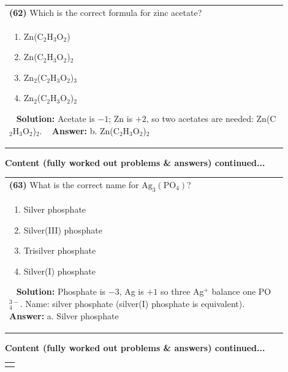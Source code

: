 \documentclass{article}
\begin{document}
{\begin{tabular}{|p{0.9\linewidth}|}
\hline
\vspace{0.2cm}
\textbf{(62)} Which is the correct formula for zinc acetate? \\
\begin{minipage}[t]{0.85\linewidth}
\begin{enumerate}[label=\alph*.]
\item Zn(C$_2$H$_3$O$_2$) \
\item Zn(C$_2$H$_3$O$_2$)$_2$ \
\item Zn$_2$(C$_2$H$_3$O$_2$)$_3$ \
\item Zn$_2$(C$_2$H$_3$O$_2$)$_2$
\end{enumerate}
\end{minipage}\
\hline
\vspace{0.2cm}
\textbf{Solution:} Acetate is $-1$; Zn is $+2$, so two acetates are needed: Zn(C$_2$H$_3$O$_2$)$_2$. \
\hline
\vspace{0.2cm}
\textbf{Answer:} b. Zn(C$_2$H$_3$O$_2$)$_2$ \
\hline
\end{tabular}
\newpage
\noindent
{\large\textbf{Content (fully worked out problems & answers) continued...}}\\[0.2em]
\begin{tabular}{|p{0.9\linewidth}|}
\hline
\vspace{0.2cm}
\textbf{(63)} What is the correct name for $\text{Ag}_3(\text{PO}_4)$? \\
\begin{minipage}[t]{0.85\linewidth}
\begin{enumerate}[label=\alph*.]
\item Silver phosphate \
\item Silver(III) phosphate \
\item Trisilver phosphate \
\item Silver(I) phosphate
\end{enumerate}
\end{minipage}\
\hline
\vspace{0.2cm}
\textbf{Solution:} Phosphate is $-3$, Ag is $+1$ so three Ag$^+$ balance one PO$_4^{3-}$. Name: silver phosphate (silver(I) phosphate is equivalent). \
\hline
\vspace{0.2cm}
\textbf{Answer:} a. Silver phosphate \
\hline
\end{tabular}
\newpage
\noindent
{\large\textbf{Content (fully worked out problems & answers) continued...}}\\[0.2em]
\begin{tabular}{|p{0.9\linewidth}|}
\hline
\vspace{0.2cm}

\end{tabular}}
\end{document}
